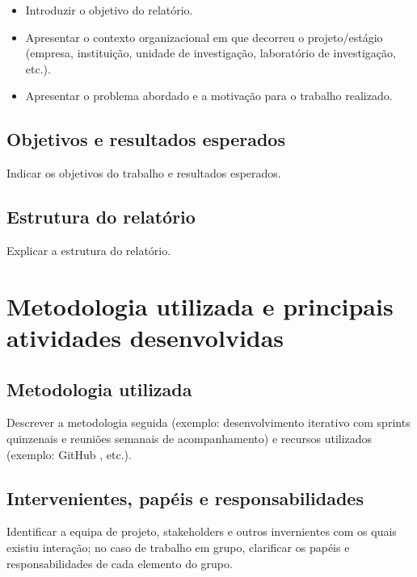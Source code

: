 \documentclass[10pt]{article}
\begin{document}
	\begin{itemize}

    \item Introduzir o objetivo do relatório.
	\item Apresentar o contexto organizacional em que decorreu o projeto/estágio (empresa, instituição, unidade de investigação, laboratório de investigação, etc.).
	\item	Apresentar o problema abordado e a motivação para o trabalho realizado. 
	
    \end{itemize}
	
	\subsection{Objetivos e resultados esperados}
	
	Indicar os objetivos do trabalho e resultados esperados.
	
	\subsection{Estrutura do relatório}
	
	Explicar a estrutura do relatório.
	
	


\section{Metodologia utilizada e principais atividades desenvolvidas}

\subsection{Metodologia utilizada}

    Descrever a metodologia\cite{despa2014comparative} seguida (exemplo: desenvolvimento iterativo com sprints quinzenais e reuniões semanais de acompanhamento) e recursos utilizados (exemplo: GitHub \cite{github}, etc.).
	
	
\subsection{Intervenientes, papéis e responsabilidades}

Identificar a equipa de projeto, stakeholders e outros invernientes com os quais existiu interação; no caso de trabalho em grupo, clarificar os papéis e responsabilidades de cada elemento do grupo.
\end{document}
